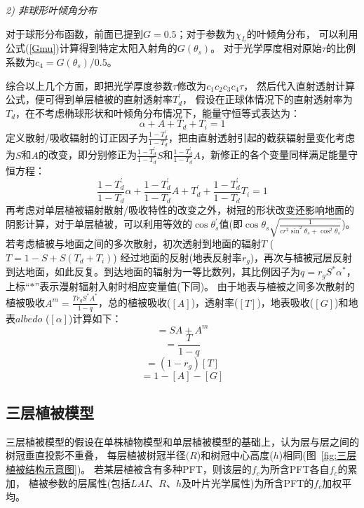 \textit{2) 非球形叶倾角分布}

对于球形分布函数，前面已提到$G=0.5$；对于参数为$\chi_L$的叶倾角分布，
可以利用公式(\ref{Gmu})计算得到特定太阳入射角的$G\left(\theta_s\right)$。
对于光学厚度相对原始$\tau$的比例系数为$c_4=G\left(\theta_s\right)/0.5$。

综合以上几个方面，即把光学厚度参数$\tau$修改为$c_1c_2c_3c_4\tau$，
然后代入直射透射计算公式，便可得到单层植被的直射透射率$T_d^\prime$，
假设在正球体情况下的直射透射率为$T_d$，在不考虑椭球形状和叶倾角分布情况下，能量守恒等式表达为：
\begin{equation}
\alpha+A+T_{d}+T_{i}=1
\end{equation}
定义散射/吸收辐射的订正因子为$\frac{1-T_d^\prime}{1-T_d}$，把由直射透射引起的截获辐射量变化考虑为$S$和$A$的改变，即分别修正为$\frac{1-T_d^\prime}{1-T_d}S$和$\frac{1-T_d^\prime}{1-T_d}A$，新修正的各个变量同样满足能量守恒方程：
\begin{equation}
\frac{1-T_{d}^{\prime}}{1-T_{d}} \alpha+\frac{1-T_{d}^{\prime}}{1-T_{d}} A+T_{d}^{\prime}+\frac{1-T_{d}^{\prime}}{1-T_{d}} T_{i}=1
\end{equation}
再考虑对单层植被辐射散射/吸收特性的改变之外，树冠的形状改变还影响地面的阴影计算，对于单层植被，可以利用等效的$\cos{\theta_s^\prime}$值(即$\cos{\theta_s}\sqrt{\frac{1}{{cr}^2\sin^2{\theta_s}+\cos^2{\theta_s}}}$)。 
若考虑植被与地面之间的多次散射，初次透射到地面的辐射$T$ ($T=1-S+S\left(T_d+T_i\right)$) 经过地面的反射(地表反射率$r_g$)，再次与植被冠层反射到达地面，如此反复。到达地面的辐射为一等比数列，其比例因子为$q=r_gS^\ast\alpha^\ast$，上标“$\ast$”表示漫射辐射入射时相应变量值(下同)。
由于地表与植被之间多次散射的植被吸收$A^m=\frac{Tr_gS^\ast A^\ast}{1-q}$，总的植被吸收($\left[A\right]$)，透射率($\left[T\right]$)，地表吸收($\left[G\right]$)和地表$albedo$ ($\left[\alpha\right]$)计算如下：
\begin{equation}
[A]=S A+A^{m}
\end{equation}
\begin{equation}
[T]=\frac{T}{1-q}
\end{equation}
\begin{equation}
[G]=\left(1-r_{g}\right)[T]
\end{equation}
\begin{equation}
[\alpha]=1-[A]-[G]
\end{equation}


\subsection{三层植被模型}
三层植被模型的假设在单株植物模型和单层植被模型的基础上，认为层与层之间的树冠垂直投影不重叠，
每层植被树冠半径$(R$)和树冠中心高度($h$)相同(图~\ref{fig:三层植被结构示意图})。
若某层植被含有多种PFT，则该层的$f_c$为所含PFT各自$f_c$的累加，
植被参数的层属性(包括$LAI$、$R$、$h$及叶片光学属性)为所含PFT的$f_c$加权平均。

